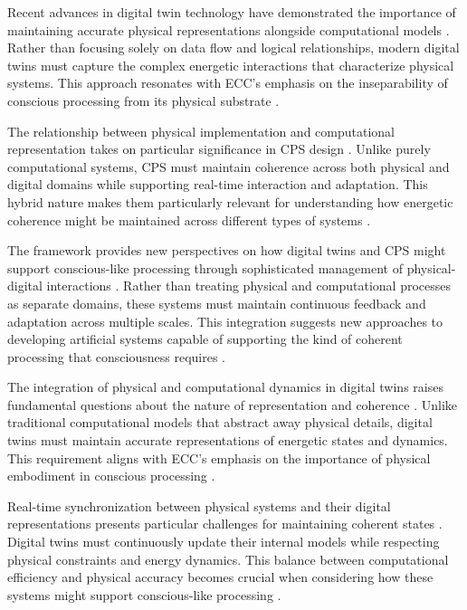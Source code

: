 \begin{refsection}
Recent advances in digital twin technology have demonstrated the importance of maintaining accurate physical representations alongside computational models \cite{Grieves2021}. Rather than focusing solely on data flow and logical relationships, modern digital twins must capture the complex energetic interactions that characterize physical systems. This approach resonates with ECC's emphasis on the inseparability of conscious processing from its physical substrate \cite{Liu2021}.

The relationship between physical implementation and computational representation takes on particular significance in CPS design \cite{Tao2019}. Unlike purely computational systems, CPS must maintain coherence across both physical and digital domains while supporting real-time interaction and adaptation. This hybrid nature makes them particularly relevant for understanding how energetic coherence might be maintained across different types of systems \cite{Uhlemann2017}.

The framework provides new perspectives on how digital twins and CPS might support conscious-like processing through sophisticated management of physical-digital interactions \cite{Wang2019}. Rather than treating physical and computational processes as separate domains, these systems must maintain continuous feedback and adaptation across multiple scales. This integration suggests new approaches to developing artificial systems capable of supporting the kind of coherent processing that consciousness requires \cite{White2021}.

The integration of physical and computational dynamics in digital twins raises fundamental questions about the nature of representation and coherence \cite{Fuller2020}. Unlike traditional computational models that abstract away physical details, digital twins must maintain accurate representations of energetic states and dynamics. This requirement aligns with ECC's emphasis on the importance of physical embodiment in conscious processing \cite{Jones2020}.

Real-time synchronization between physical systems and their digital representations presents particular challenges for maintaining coherent states \cite{Madni2019}. Digital twins must continuously update their internal models while respecting physical constraints and energy dynamics. This balance between computational efficiency and physical accuracy becomes crucial when considering how these systems might support conscious-like processing \cite{Minerva2020}.


\end{refsection}
